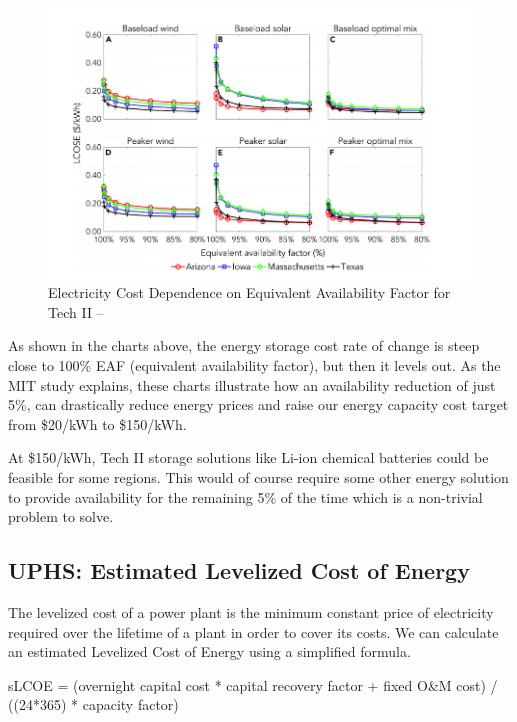 \documentclass[hidelinks,12pt,a4paper]{article}
\begin{document}
\begin{figure}[ht!]
    \centering
    \includegraphics[width=1\textwidth]{cost-as-function-of-availability-factor.png}
    \caption{Electricity Cost Dependence on Equivalent Availability Factor for Tech II -- \cite{StorageRequirementsAndCostsOfShapingRenewableEnergy}}
\end{figure}
\FloatBarrier

As shown in the charts above, the energy storage cost rate of change is steep close to 100\% EAF (equivalent availability factor), but then it levels out. As the MIT study explains, these charts illustrate how an availability reduction of just 5\%, can drastically reduce energy prices and raise our energy capacity cost target from \$20/kWh to \$150/kWh.

At \$150/kWh, Tech II storage solutions like Li-ion chemical batteries could be feasible for some regions. This would of course require some other energy solution to provide availability for the remaining 5\% of the time which is a non-trivial problem to solve.

\subsection{UPHS: Estimated Levelized Cost of Energy}
The levelized cost of a power plant is the minimum constant price of electricity required over the lifetime of a plant in order to cover its costs. We can calculate an estimated Levelized Cost of Energy using a simplified formula.

\begin{displayquote}
sLCOE = (overnight capital cost * capital recovery factor + fixed O\&M cost) / ((24*365) * capacity factor) \cite{SimpleLevelizedCostOfEnergyCalculator}
\end{displayquote}
\end{document}
